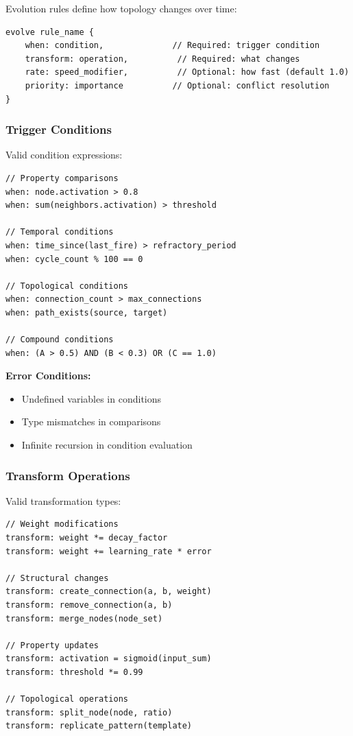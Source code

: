 \documentclass[12pt,a4paper,openany]{book} %
\begin{document}
Evolution rules define how topology changes over time:

\vspace{0.5em}
\begin{lstlisting}[language=loom]
evolve rule_name {
    when: condition,              // Required: trigger condition
    transform: operation,          // Required: what changes
    rate: speed_modifier,          // Optional: how fast (default 1.0)
    priority: importance          // Optional: conflict resolution
}
\end{lstlisting}
\vspace{0.5em}

\subsubsection{Trigger Conditions}

Valid condition expressions:

\vspace{0.5em}
\begin{lstlisting}[language=loom]
// Property comparisons
when: node.activation > 0.8
when: sum(neighbors.activation) > threshold

// Temporal conditions
when: time_since(last_fire) > refractory_period
when: cycle_count % 100 == 0

// Topological conditions
when: connection_count > max_connections
when: path_exists(source, target)

// Compound conditions
when: (A > 0.5) AND (B < 0.3) OR (C == 1.0)
\end{lstlisting}
\vspace{0.5em}

\textbf{Error Conditions:}
\begin{itemize}
\item Undefined variables in conditions
\item Type mismatches in comparisons
\item Infinite recursion in condition evaluation
\end{itemize}

\subsubsection{Transform Operations}

Valid transformation types:

\vspace{0.5em}
\begin{lstlisting}[language=loom]
// Weight modifications
transform: weight *= decay_factor
transform: weight += learning_rate * error

// Structural changes
transform: create_connection(a, b, weight)
transform: remove_connection(a, b)
transform: merge_nodes(node_set)

// Property updates
transform: activation = sigmoid(input_sum)
transform: threshold *= 0.99

// Topological operations
transform: split_node(node, ratio)
transform: replicate_pattern(template)
\end{lstlisting}
\vspace{0.5em}
\end{document}
